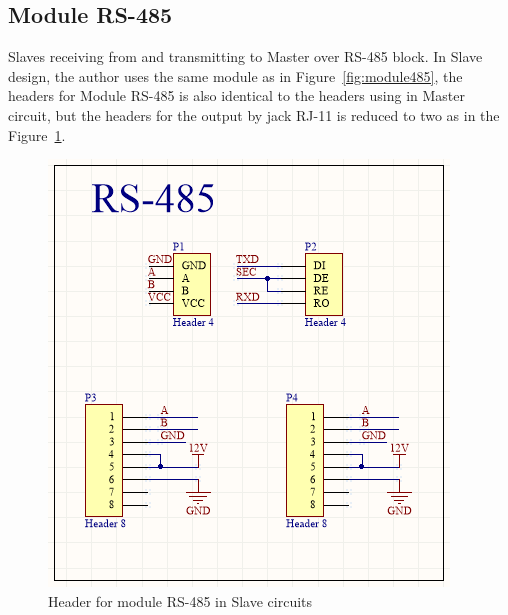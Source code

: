    \subsection{Module RS-485}
    Slaves receiving from and transmitting to Master over RS-485 block. In Slave design, the author uses the same module as in Figure~\ref{fig:module485}, the headers for Module RS-485 is also identical to the headers using in Master circuit, but the headers for the output by jack RJ-11 is reduced to two as in the Figure~\ref{fig:header485Slave}.
    \begin{figure}[!ht]
      \begin{center}
      \includegraphics[scale=1]{images/header485Slave.png}
      \caption{Header for module RS-485 in Slave circuits}
      \label{fig:header485Slave}
      \end{center}
  \end{figure}

